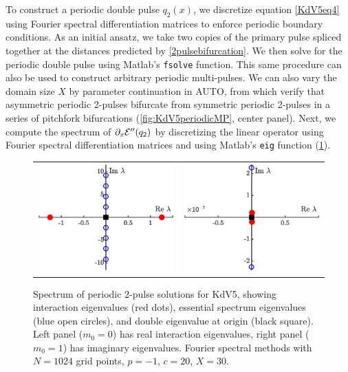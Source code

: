 \documentclass[12pt]{elsarticle}
\theoremstyle{plain}
\theoremstyle{definition}
\theoremstyle{remark}
\numberwithin{theorem}{section}
\numberwithin{equation}{section}
\begin{document}
To construct a periodic double pulse $q_2(x)$, we discretize equation \cref{KdV5eq4} using Fourier spectral differentiation matrices to enforce periodic boundary conditions. As an initial ansatz, we take two copies of the primary pulse spliced together at the distances predicted by \cref{2pulsebifurcation}. We then solve for the periodic double pulse using Matlab's \texttt{fsolve} function. This same procedure can also be used to construct arbitrary periodic multi-pulses. We can also vary the domain size $X$ by parameter continuation in AUTO, from which verify that asymmetric periodic 2-pulses bifurcate from symmetric periodic 2-pulses in a series of pitchfork bifurcations (\cref{fig:KdV5periodicMP}, center panel). Next, we compute the spectrum of $\partial_x \mathcal{E}''(q_2)$ by discretizing the linear operator using Fourier spectral differentiation matrices and using Matlab's \texttt{eig} function (\cref{fig:KdV5eigs1}). 
\begin{figure}
\begin{center}
\begin{tabular}{cc}
\includegraphics[width=8cm]{images/dp1spec.eps} &
\includegraphics[width=8cm]{images/dp2spec.eps}
\end{tabular}
\end{center}
\caption[Spectrum of periodic 2-pulse solutions]{Spectrum of periodic 2-pulse solutions for KdV5, showing interaction eigenvalues (red dots), essential spectrum eigenvalues (blue open circles), and double eigenvalue at origin (black square). Left panel ($m_0 = 0$) has real interaction eigenvalues, right panel ($m_0 = 1$) has imaginary eigenvalues. Fourier spectral methods with $N = 1024$ grid points, $p = -1$, $c = 20$, $X = 30$.}
\label{fig:KdV5eigs1}
\end{figure}
\end{document}
